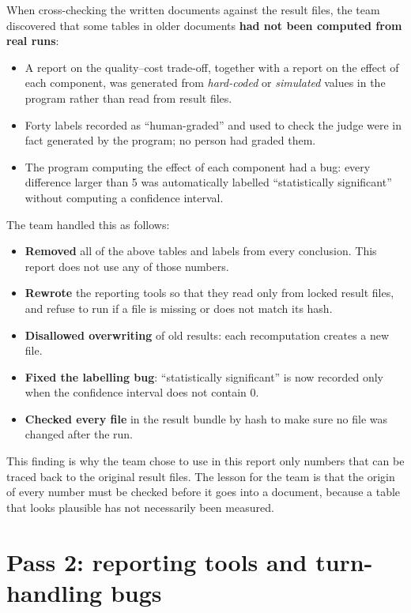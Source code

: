 When cross-checking the written documents against the result files, the team discovered that some tables in older documents \textbf{had not been computed from real runs}:

\begin{itemize}
    \item A report on the quality--cost trade-off, together with a report on the effect of each component, was generated from \emph{hard-coded} or \emph{simulated} values in the program rather than read from result files.
    \item Forty labels recorded as ``human-graded'' and used to check the judge were in fact generated by the program; no person had graded them.
    \item The program computing the effect of each component had a bug: every difference larger than 5 \pp{} was automatically labelled ``statistically significant'' without computing a confidence interval.
\end{itemize}

The team handled this as follows:

\begin{itemize}
    \item \textbf{Removed} all of the above tables and labels from every conclusion. This report does not use any of those numbers.
    \item \textbf{Rewrote} the reporting tools so that they read only from locked result files, and refuse to run if a file is missing or does not match its hash.
    \item \textbf{Disallowed overwriting} of old results: each recomputation creates a new file.
    \item \textbf{Fixed the labelling bug}: ``statistically significant'' is now recorded only when the confidence interval does not contain 0.
    \item \textbf{Checked every file} in the result bundle by hash to make sure no file was changed after the run.
\end{itemize}

This finding is why the team chose to use in this report only numbers that can be traced back to the original result files. The lesson for the team is that the origin of every number must be checked before it goes into a document, because a table that looks plausible has not necessarily been measured.

\section{Pass 2: reporting tools and turn-handling bugs}

